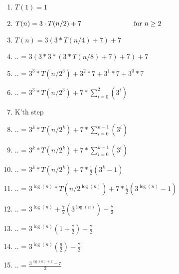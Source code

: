 \documentclass[12pt]{article}
\begin{document}
\begin{enumerate}
\begin{enumerate}
\item $T(1) = 1$
\item $T(n) = 3\cdot T(n/2) + 7 \hspace*{1.0in} \text{ for }n \ge 2$
\item $T(n) = 3(3*T(n/4) +7) +7$
\item ..   = $3(3*3*(3*T(n/8) + 7)+ 7 ) +7$
\item ..   = $3^3*T(n/2^3) + 3^2*7+3^1*7+3^0*7$
\item ..   = $3^3*T(n/2^3) + 7*\displaystyle\sum\limits_{i=0}^2 (3^i)$
\item  K'th step
\item .. = $3^k*T(n/2^k) + 7*\displaystyle\sum\limits_{i=0}^{k-1} (3^i)$
\item .. = $3^k*T(n/2^k) + 7*\displaystyle\sum\limits_{i=0}^{k-1} (3^i)$
\item .. = $3^k*T(n/2^k) + 7*\frac{1}{2}(3^k-1)$
\item .. = $3^{\log(n)}*T(n/2^{\log(n)}) + 7*\frac{1}{2}(3^{\log(n)}-1)$
\item .. = $3^{\log(n)} + \frac{7}{2}(3^{\log(n)})-\frac{7}{2}$
\item .. = $3^{\log(n)}(1+\frac{7}{2}) -\frac{7}{2}$
\item .. = $3^{\log(n)}(\frac{9}{2}) -\frac{7}{2}$
\item .. = $\frac{3^{\log(n)+2}-7}{2}$
\end{enumerate}



\end{enumerate}
\end{document}
